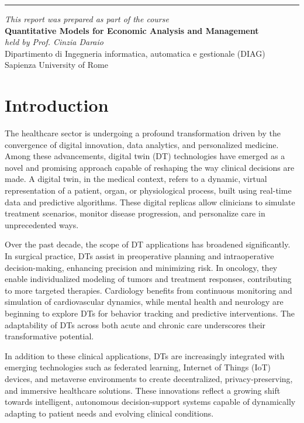 \documentclass[10pt,a4paper]{article}
\begin{document}
\vspace{1em}
\hrule
\vspace{2em}

\vspace*{\fill}
{\small
\begin{flushleft}
\textit{This report was prepared as part of the course}\\
\textbf{Quantitative Models for Economic Analysis and Management}\\
\textit{held by Prof. Cinzia Daraio}\\
Dipartimento di Ingegneria informatica, automatica e gestionale (DIAG)\\
Sapienza University of Rome
\end{flushleft}
}

\newpage

\section{Introduction}
The healthcare sector is undergoing a profound transformation driven by the convergence of digital innovation, data analytics, and personalized medicine. Among these advancements, digital twin (DT) technologies have emerged as a novel and promising approach capable of reshaping the way clinical decisions are made. A digital twin, in the medical context, refers to a dynamic, virtual representation of a patient, organ, or physiological process, built using real-time data and predictive algorithms. These digital replicas allow clinicians to simulate treatment scenarios, monitor disease progression, and personalize care in unprecedented ways.

Over the past decade, the scope of DT applications has broadened significantly. In surgical practice, DTs assist in preoperative planning and intraoperative decision-making, enhancing precision and minimizing risk. In oncology, they enable individualized modeling of tumors and treatment responses, contributing to more targeted therapies. Cardiology benefits from continuous monitoring and simulation of cardiovascular dynamics, while mental health and neurology are beginning to explore DTs for behavior tracking and predictive interventions. The adaptability of DTs across both acute and chronic care underscores their transformative potential.

In addition to these clinical applications, DTs are increasingly integrated with emerging technologies such as federated learning, Internet of Things (IoT) devices, and metaverse environments to create decentralized, privacy-preserving, and immersive healthcare solutions. These innovations reflect a growing shift towards intelligent, autonomous decision-support systems capable of dynamically adapting to patient needs and evolving clinical conditions.
\end{document}
